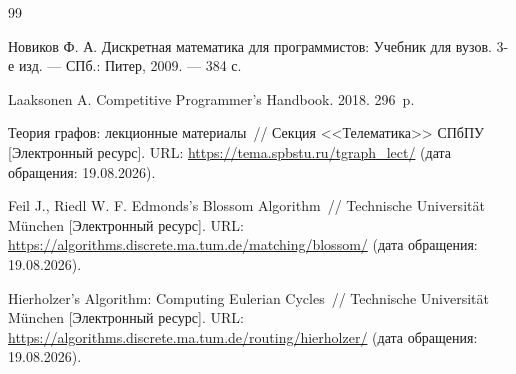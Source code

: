 \begin{thebibliography}{99}

Новиков Ф. А. Дискретная математика для программистов: Учебник для вузов. 3-е изд. — СПб.: Питер, 2009. — 384 с.

Laaksonen A. Competitive Programmer's Handbook. 2018. 296~p.

Теория графов: лекционные материалы~// Секция <<Телематика>> СПбПУ [Электронный ресурс]. URL: \url{https://tema.spbstu.ru/tgraph_lect/} (дата обращения: 19.08.2026).

Feil J., Riedl W. F. Edmonds's Blossom Algorithm~// Technische Universität München [Электронный ресурс]. URL: \url{https://algorithms.discrete.ma.tum.de/matching/blossom/} (дата обращения: 19.08.2026).

Hierholzer's Algorithm: Computing Eulerian Cycles~// Technische Universität München [Электронный ресурс]. URL: \url{https://algorithms.discrete.ma.tum.de/routing/hierholzer/} (дата обращения: 19.08.2026).

\end{thebibliography}
